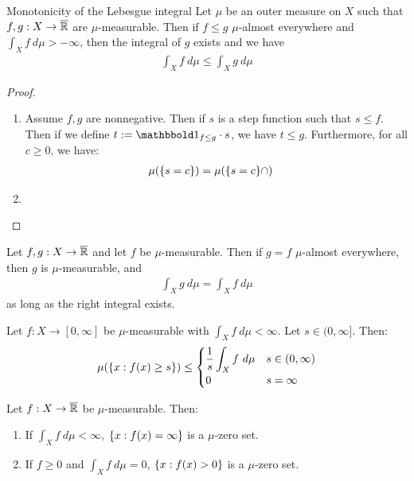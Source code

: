 \begin{importanttheorem}
	{Monotonicity of the Lebesgue integral}{}
	Let $\mu$ be an outer measure on $X$ such that $f,g : X \to \overline{{\mathbb{R}}}$ are $\mu$-measurable. Then if $f \leq g$ $\mu$-almost everywhere and $\int_X f ~d\mu > -\infty$, then the integral of $g$ exists and we have
	\begin{align*}
		\int_X f ~d\mu \leq \int_X g ~d\mu
	\end{align*}
\end{importanttheorem}
\begin{proof}
	\begin{enumerate}
		\item Assume $f,g$ are nonnegative. Then if $s$ is a step function such that $s \leq f$. Then if we define $t := \boldone_{f \leq g} \cdot s$, we have $t \leq g$. Furthermore, for all $c \geq 0$, we have:
		\begin{align*}
			\mu(\qty{s = c})
			&= \mu(\qty{s = c} \cap)
		\end{align*}
		\item
	\end{enumerate}
\end{proof}
\begin{importanttheorem}{}{}
	Let $f,g : X \to \overline{{\mathbb{R}}}$ and let $f$ be $\mu$-measurable. Then if $g = f$ $\mu$-almost everywhere, then $g$ is $\mu$-measurable, and
	\begin{align*}
		\int_X g ~d\mu = \int_X f ~d\mu
	\end{align*}
	as long as the right integral exists.
\end{importanttheorem}
\begin{lemma}
	Let $f : X \to [0, \infty]$ be $\mu$-measurable with $\int_X f ~d\mu < \infty$. Let $s \in (0,\infty]$. Then:
	\begin{align*}
		\mu(\qty{x : f(x) \geq s}) \leq 
		\begin{cases}
			\displaystyle\frac{1}{s}\int_X f ~d\mu & s \in (0,\infty)\\
			0 & s = \infty
		\end{cases}
	\end{align*}
\end{lemma}
\begin{corollary}
	Let $f : X \to \overline{{\mathbb{R}}}$ be $\mu$-measurable. Then:
	\begin{enumerate}
		\item If $\int_X f ~d\mu < \infty$, $\qty{x : f(x) = \infty}$ is a $\mu$-zero set.
		\item If $f \geq 0$ and $\int_X f ~d\mu = 0$, $\qty{x : f(x) > 0}$ is a $\mu$-zero set.
	\end{enumerate}
\end{corollary}
